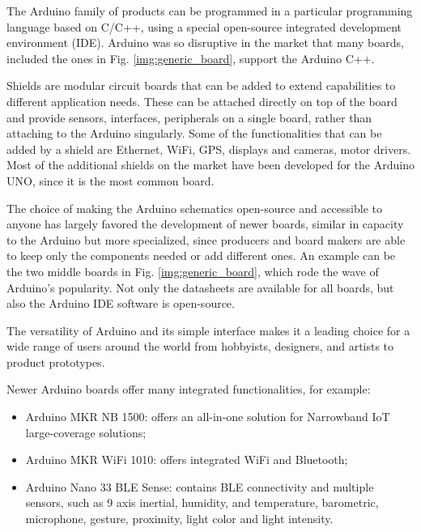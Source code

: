 			The Arduino family of products can be programmed in a particular programming language based on C/C++, using a special open-source integrated development environment (IDE).
			Arduino was so disruptive in the market that many boards, included the ones in Fig. \ref{img:generic_board}, support the Arduino C++.
	
			Shields are modular circuit boards that can be added to extend capabilities to different application needs.
			These can be attached directly on top of the board and provide sensors, interfaces, peripherals on a single board, rather than attaching to the Arduino singularly.
			Some of the functionalities that can be added by a shield are Ethernet, WiFi, GPS, displays and cameras, motor drivers.
			Most of the additional shields on the market have been developed for the Arduino UNO, since it is the most common board.
			
			The choice of making the Arduino schematics open-source and accessible to anyone has largely favored the development of newer boards, similar in capacity to the Arduino but more specialized, since producers and board makers are able to keep only the components needed or add different ones.
			An example can be the two middle boards in Fig. \ref{img:generic_board}, which rode the wave of Arduino's popularity.
			Not only the datasheets are available for all boards, but also the Arduino IDE software is open-source.
			
			The versatility of Arduino and its simple interface makes it a leading choice for a wide range of users around the world from hobbyists, designers, and artists to product prototypes. 
			
			Newer Arduino boards offer many integrated functionalities, for example:
			\begin{itemize}[noitemsep]
				\item Arduino MKR NB 1500: offers an all-in-one solution for Narrowband IoT large-coverage solutions;
				\item Arduino MKR WiFi 1010: offers integrated WiFi and Bluetooth;
				\item Arduino Nano 33 BLE Sense: contains BLE connectivity and multiple sensors, such as 9 axis inertial, humidity, and temperature, barometric, microphone, gesture, proximity, light color and light intensity.
			\end{itemize}
		
